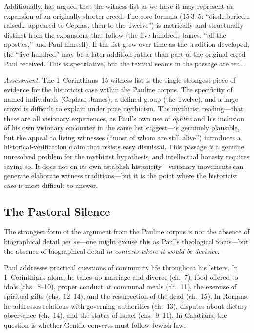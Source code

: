 \documentclass[12pt,oneside]{article}
\newcommand{\grk}[1]{\textit{#1}}   %
\begin{document}
Additionally, \citet{Carrier2014} has argued that the witness list as
we have it may represent an expansion of an originally shorter creed.
The core formula (15:3--5: ``died\ldots buried\ldots raised\ldots
appeared to Cephas, then to the Twelve'') is metrically and
structurally distinct from the expansions that follow (the five hundred,
James, ``all the apostles,'' and Paul himself).  If the list grew over
time as the tradition developed, the ``five hundred'' may be a later
addition rather than part of the original creed Paul received.  This is
speculative, but the textual seams in the passage are real.

\textit{Assessment.}  The 1~Corinthians~15 witness list is the single
strongest piece of evidence for the historicist case within the Pauline
corpus.  The specificity of named individuals (Cephas, James), a
defined group (the Twelve), and a large crowd is difficult to explain
under pure mythicism.  The mythicist reading---that these are all
visionary experiences, as Paul's own use of \grk{\'ophth\=e} and his
inclusion of his own visionary encounter in the same list
suggest---is genuinely plausible, but the appeal to living witnesses
(``most of whom are still alive'') introduces a historical-verification
claim that resists easy dismissal.  This passage is a genuine unresolved
problem for the mythicist hypothesis, and intellectual honesty requires
saying so.  It does not on its own establish historicity---visionary
movements can generate elaborate witness traditions---but it is the
point where the historicist case is most difficult to answer.

\subsection{The Pastoral Silence}
\label{sec:paul:silence}

The strongest form of the argument from the Pauline corpus is not the
absence of biographical detail \textit{per se}---one might excuse this
as Paul's theological focus---but the absence of biographical detail
\textit{in contexts where it would be decisive}.

Paul addresses practical questions of community life throughout his
letters.  In 1~Corinthians alone, he takes up marriage and divorce
(ch.~7), food offered to idols (chs.~8--10), proper conduct at
communal meals (ch.~11), the exercise of spiritual gifts (chs.~12--14),
and the resurrection of the dead (ch.~15).  In Romans, he addresses
relations with governing authorities (ch.~13), disputes about dietary
observance (ch.~14), and the status of Israel (chs.~9--11).  In
Galatians, the question is whether Gentile converts must follow Jewish
law.
\end{document}
